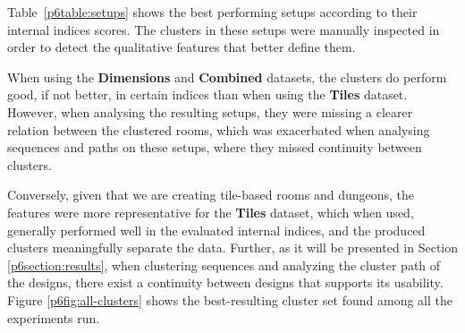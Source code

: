 Table~\ref{p6table:setups} shows the best performing setups according to their internal indices scores. The clusters in these setups were manually inspected in order to detect the qualitative features that better define them. 

When using the \textbf{Dimensions} and \textbf{Combined} datasets, the clusters do perform good, if not better, in certain indices than when using the \textbf{Tiles} dataset. However, when analysing the resulting setups, they were missing a clearer relation between the clustered rooms, which was exacerbated when analysing sequences and paths on these setups, where they missed continuity between clusters.

Conversely, given that we are creating tile-based rooms and dungeons, the features were more representative for the \textbf{Tiles} dataset, which when used, generally performed well in the evaluated internal indices, and the produced clusters meaningfully separate the data. Further, as it will be presented in Section \ref{p6section:results}, when clustering sequences and analyzing the cluster path of the designs, there exist a continuity between designs that supports its usability. Figure \ref{p6fig:all-clusters} shows the best-resulting cluster set found among all the experiments run.








